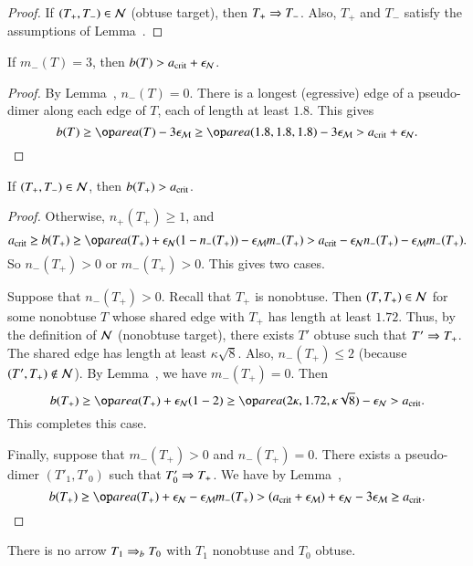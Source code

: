 \begin{proof} If $(T_+,T_-)\in \mathcal N$ (obtuse target), then $T_+\Rightarrow T_-$.
  Also, $T_+$ and $T_-$ satisfy the assumptions of
  Lemma~.
\end{proof}

\begin{lemma} 
If $m_-(T) = 3$, then $b(T) > a_\text{crit} + \epsilon_{\mathcal N}$.
\end{lemma}

\begin{proof} By Lemma~, $n_-(T)=0$.  There is a
  longest (egressive) edge of a pseudo-dimer along each edge of $T$,
  each of length at least $1.8$.  This gives
\[
b(T) \ge \area(T) - 3\epsM 
\ge \area(1.8,1.8,1.8) - 3\epsM > \acrit + \epsN.
\]
\end{proof}

\begin{lemma}  
  If $(T_+,T_-)\in \mathcal N$, then $b(T_+)>a_\text{crit}$.
\end{lemma}

\begin{proof}  Otherwise, $n_+(T_+)\ge 1$, and
\[
\acrit \ge b(T_+) 
\ge \area(T_+) + \epsN (1 - n_-(T_+)) - \epsM m_-(T_+)
> \acrit - \epsN n_-(T_+) - \epsM m_-(T_+).
\]
So $n_-(T_+) > 0$ or $m_-(T_+)>0$. This gives two cases.  

Suppose that $n_-(T_+) >0$.  Recall that $T_+$ is nonobtuse.  Then
$(T,T_+)\in\mathcal N$ for some nonobtuse $T$ whose shared edge with $T_+$ has
length at least $1.72$.  Thus, by the definition of $\mathcal N$ (nonobtuse
target), there exists $T'$ obtuse such that $T'\Rightarrow T_+$.  The shared
edge has length at least $\kappa\sqrt8$.  Also, $n_-(T_+)\le 2$
(because $(T',T_+)\not\in \mathcal N$).  By Lemma~, we have
$m_-(T_+)=0$.  Then
\[
b(T_+) \ge \area(T_+) + \epsN (1 - 2) 
\ge \area (2\kappa,1.72,\kappa\sqrt8) - \epsN > \acrit.
\]
This completes this case.

Finally, suppose that $m_-(T_+)>0$ and $n_-(T_+)=0$.  There exists a
pseudo-dimer $(T'_1,T'_0)$ such that $T'_0\Rightarrow T_+$.  We have
by Lemma~,
\[
b(T_+) \ge \area(T_+)+\epsN - \epsM m_-(T_+) 
> (\acrit + \epsM) + \epsN -3\epsM  \ge \acrit.
\]
\end{proof}



\begin{lemma} 
  There is no arrow $T_1 \Rightarrow_{b} T_0$ with $T_1$ nonobtuse and $T_0$
  obtuse.
\end{lemma}

